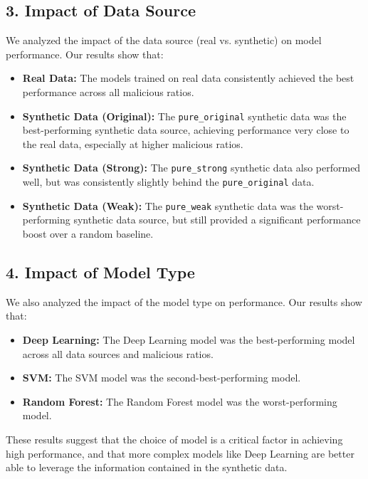 \documentclass{article}
\begin{document}
\subsection*{3. Impact of Data Source}

We analyzed the impact of the data source (real vs. synthetic) on model performance. Our results show that:

\begin{itemize}
    \item \textbf{Real Data:} The models trained on real data consistently achieved the best performance across all malicious ratios.
    \item \textbf{Synthetic Data (Original):} The \texttt{pure_original} synthetic data was the best-performing synthetic data source, achieving performance very close to the real data, especially at higher malicious ratios.
    \item \textbf{Synthetic Data (Strong):} The \texttt{pure_strong} synthetic data also performed well, but was consistently slightly behind the \texttt{pure_original} data.
    \item \textbf{Synthetic Data (Weak):} The \texttt{pure_weak} synthetic data was the worst-performing synthetic data source, but still provided a significant performance boost over a random baseline.
\end{itemize}

\subsection*{4. Impact of Model Type}

We also analyzed the impact of the model type on performance. Our results show that:

\begin{itemize}
    \item \textbf{Deep Learning:} The Deep Learning model was the best-performing model across all data sources and malicious ratios.
    \item \textbf{SVM:} The SVM model was the second-best-performing model.
    \item \textbf{Random Forest:} The Random Forest model was the worst-performing model.
\end{itemize}

These results suggest that the choice of model is a critical factor in achieving high performance, and that more complex models like Deep Learning are better able to leverage the information contained in the synthetic data.
\end{document}
